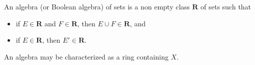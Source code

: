 An algebra (or Boolean algebra) of sets is a non empty class $\mathbf{R}$ of sets such that
\begin{itemize}
\item[(a)] if $E \in \mathbf{R}$ and $F \in \mathbf{R}$, then $E \cup F \in \mathbf{R}$, and
\item[(b)] if $E \in \mathbf{R}$, then $E' \in \mathbf{R}$.
\end{itemize}
An algebra may be characterized as a ring containing $X$.
